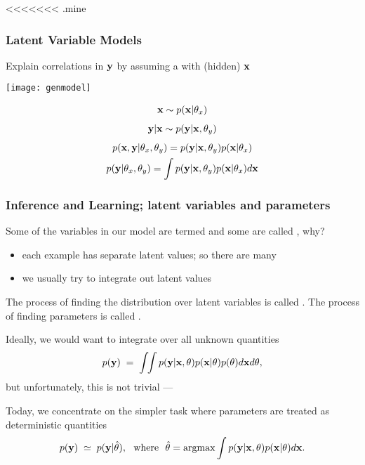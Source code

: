 




<<<<<<< .mine
\begin{frame}
\frametitle{Latent Variable Models}

Explain correlations in $\mathbf y$ by assuming a  with
 (hidden)  $\mathbf x$

\vfill 

\begin{minipage}{61mm}
\centerline{\texttt{[image: genmodel]}}
\end{minipage}
\begin{minipage}{61mm}
  \begin{gather*}
    \mathbf x \sim p(\mathbf x|\theta_x)\\[1ex]
    \mathbf y|\mathbf x \sim p(\mathbf y|\mathbf x,\theta_y) \\[1ex]
    p(\mathbf x,\mathbf y|\theta_x,\theta_y)=p(\mathbf y|\mathbf x,\theta_y)p(\mathbf x|\theta_x)\\
    p(\mathbf y | \theta_x, \theta_y) =
      \int p(\mathbf y | \mathbf x, \theta_y) p(\mathbf x | \theta_x)d \mathbf x
  \end{gather*}
\end{minipage}
\end{frame}

\begin{frame}
\frametitle{Inference and Learning; latent variables and parameters}

Some of the variables in our model are termed 
and some are called , why?
\begin{itemize}
\item each example has separate latent values; so there are many
\item we usually try to integrate out latent values
\end{itemize}

The process of finding the distribution over latent variables is called
. The process of finding parameters is called .

Ideally, we would want to integrate over all unknown quantities
\[
p(\mathbf y)\;=\;\int\!\!\int p(\mathbf y|\mathbf x,\theta)p(\mathbf x|\theta)p(\theta)d\mathbf x d\theta,
\]
but unfortunately, this is not trivial --- 

Today, we concentrate on the simpler task where parameters are treated
as deterministic quantities
\[
p(\bfy)\;\simeq\;p(\bfy|\hat\theta), \text{\ \ where\ \ }
\hat\theta=\argmax\int p(\bfy|\bfx,\theta)p(\bfx|\theta)d\bfx.
\]
\end{frame}

